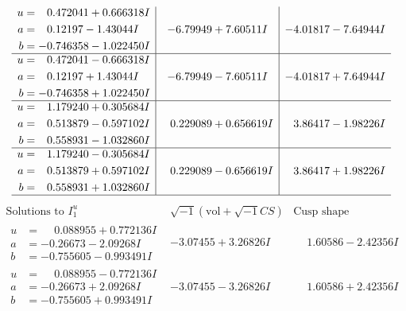 \documentclass[1p]{elsarticle_modified}
\theoremstyle{definition}
\newcommand{\I}{\sqrt{-1}}
\begin{document}
$$\begin{array}{c|c|c}
\begin{aligned}
u &= \phantom{-}0.472041 + 0.666318 I \\
a &= \phantom{-}0.12197 - 1.43044 I \\
b &= -0.746358 - 1.022450 I\end{aligned}
 & -6.79949 + 7.60511 I & -4.01817 - 7.64944 I \\ \hline\begin{aligned}
u &= \phantom{-}0.472041 - 0.666318 I \\
a &= \phantom{-}0.12197 + 1.43044 I \\
b &= -0.746358 + 1.022450 I\end{aligned}
 & -6.79949 - 7.60511 I & -4.01817 + 7.64944 I \\ \hline\begin{aligned}
u &= \phantom{-}1.179240 + 0.305684 I \\
a &= \phantom{-}0.513879 - 0.597102 I \\
b &= \phantom{-}0.558931 - 1.032860 I\end{aligned}
 & \phantom{-}0.229089 + 0.656619 I & \phantom{-}3.86417 - 1.98226 I \\ \hline\begin{aligned}
u &= \phantom{-}1.179240 - 0.305684 I \\
a &= \phantom{-}0.513879 + 0.597102 I \\
b &= \phantom{-}0.558931 + 1.032860 I\end{aligned}
 & \phantom{-}0.229089 - 0.656619 I & \phantom{-}3.86417 + 1.98226 I\\
 \hline 
 \end{array}$$\newpage$$\begin{array}{c|c|c}  
\text{Solutions to }I^u_{1}& \I (\text{vol} + \sqrt{-1}CS) & \text{Cusp shape}\\
 \hline 
\begin{aligned}
u &= \phantom{-}0.088955 + 0.772136 I \\
a &= -0.26673 - 2.09268 I \\
b &= -0.755605 - 0.993491 I\end{aligned}
 & -3.07455 + 3.26826 I & \phantom{-}1.60586 - 2.42356 I \\ \hline\begin{aligned}
u &= \phantom{-}0.088955 - 0.772136 I \\
a &= -0.26673 + 2.09268 I \\
b &= -0.755605 + 0.993491 I\end{aligned}
 & -3.07455 - 3.26826 I & \phantom{-}1.60586 + 2.42356 I \\ \hline\begin{aligned}

\end{aligned}
\end{array}$$
\end{document}
